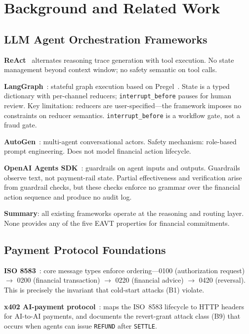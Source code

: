 \documentclass{article}
\begin{document}
\section{Background and Related Work}

\subsection{LLM Agent Orchestration Frameworks}

\textbf{ReAct}~\cite{react} alternates reasoning trace generation with tool execution. No state management beyond context window; no safety semantic on tool calls.

\textbf{LangGraph}~\cite{langgraph}: stateful graph execution based on Pregel~\cite{pregel}. State is a typed dictionary with per-channel reducers; \texttt{interrupt\_before} pauses for human review. Key limitation: reducers are user-specified---the framework imposes no constraints on reducer semantics. \texttt{interrupt\_before} is a workflow gate, not a fraud gate.

\textbf{AutoGen}~\cite{autogen}: multi-agent conversational actors. Safety mechanism: role-based prompt engineering. Does not model financial action lifecycle.

\textbf{OpenAI Agents SDK}~\cite{openai_agents}: guardrails on agent inputs and outputs. Guardrails observe text, not payment-rail state. Partial effectiveness and verification arise from guardrail checks, but these checks enforce no grammar over the financial action sequence and produce no audit log.

\textbf{Summary}: all existing frameworks operate at the reasoning and routing layer. None provides any of the five EAVT properties for financial commitments.

\subsection{Payment Protocol Foundations}

\textbf{ISO 8583}~\cite{iso8583}: core message types enforce ordering---0100 (authorization request) $\to$ 0200 (financial transaction) $\to$ 0220 (financial advice) $\to$ 0420 (reversal). This is precisely the invariant that cold-start attacks (B1) violate.

\textbf{x402 AI-payment protocol}~\cite{x402}: maps the ISO~8583 lifecycle to HTTP headers for AI-to-AI payments, and documents the revert-grant attack class (B9) that occurs when agents can issue \texttt{REFUND} after \texttt{SETTLE}.
\end{document}
